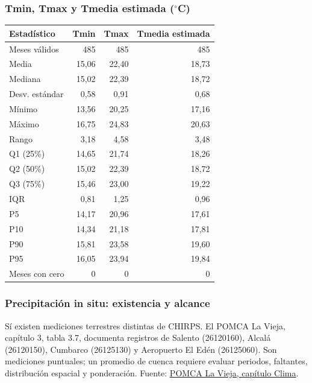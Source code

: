 \documentclass[10pt,a4paper]{article}
\begin{document}
\subsubsection*{Tmin, Tmax y Tmedia estimada ($^\circ$C)}
\begin{center}\small\begin{center}
\begin{tabular}{lrrr}\hline
Estadístico & Tmin & Tmax & Tmedia estimada \\ \hline
Meses válidos & 485 & 485 & 485 \\
Media & 15,06 & 22,40 & 18,73 \\
Mediana & 15,02 & 22,39 & 18,72 \\
Desv. estándar & 0,58 & 0,91 & 0,68 \\
Mínimo & 13,56 & 20,25 & 17,16 \\
Máximo & 16,75 & 24,83 & 20,63 \\
Rango & 3,18 & 4,58 & 3,48 \\
Q1 (25\%) & 14,65 & 21,74 & 18,26 \\
Q2 (50\%) & 15,02 & 22,39 & 18,72 \\
Q3 (75\%) & 15,46 & 23,00 & 19,22 \\
IQR & 0,81 & 1,25 & 0,96 \\
P5 & 14,17 & 20,96 & 17,61 \\
P10 & 14,34 & 21,18 & 17,81 \\
P90 & 15,81 & 23,58 & 19,60 \\
P95 & 16,05 & 23,94 & 19,84 \\
Meses con cero & 0 & 0 & 0 \\
\hline\end{tabular}
\end{center}\end{center}
\subsubsection*{Precipitación in situ: existencia y alcance}
Sí existen mediciones terrestres distintas de CHIRPS. El POMCA La Vieja,
capítulo 3, tabla 3.7, documenta registros de Salento (26120160), Alcalá
(26120150), Cumbarco (26125130) y Aeropuerto El Edén (26125060).
Son mediciones puntuales; un promedio de cuenca requiere evaluar periodos,
faltantes, distribución espacial y ponderación. Fuente:
\href{https://www.cvc.gov.co/sites/default/files/Planes_y_Programas/Planes_de_Ordenacion_y_Manejo_de_Cuencas_Hidrografica/La%20Vieja%20-%20POMCA%20en%20Ajuste/Fase%20Diagnostico/3_CapituloI_Diagnostico_Clima.pdf}{POMCA La Vieja, capítulo Clima}.
\end{document}
